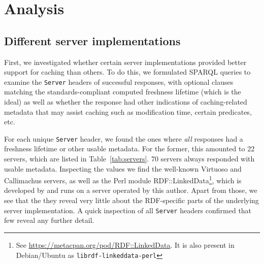 \documentclass{llncs}
\newcommand{\httph}[1]{\texttt{#1}}
\begin{document}
\section{Analysis}

\subsection{Different server implementations}

First, we investigated whether certain server implementations provided
better support for caching than others. To do this, we formulated
SPARQL queries to examine the \httph{Server} headers of successful
responses, with optional clauses matching the standards-compliant
computed freshness lifetime (which is the ideal) as well as whether
the response had other indications of caching-related metadata that
may assist caching such as modification time, certain predicates, etc.

For each unique \httph{Server} header, we found the ones where
\emph{all} responses had a freshness lifetime or other usable
metadata. For the former, this amounted to 22 servers, which are
listed in Table~\ref{tab:servers}.  70 servers always responded with
usable metadata. Inspecting the values we find the well-known Virtuoso
and Callimachus servers, as well as the Perl module
RDF::LinkedData\footnote{See
  \url{https://metacpan.org/pod/RDF::LinkedData}. It is also present
  in Debian/Ubuntu as \texttt{librdf-linkeddata-perl}}, which is
developed by and runs on a server operated by this author. Apart from
those, we see that the they reveal very little about the RDF-specific
parts of the underlying server implementation. A quick inspection of
all \httph{Server} headers confirmed that few reveal any further
detail.
\end{document}
